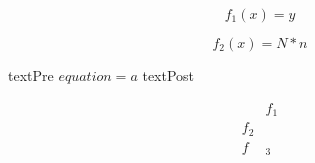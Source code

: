 \documentclass{article}
\begin{document}
    \begin{equation}
        f_1(x) = y
    \end{equation}
    
    \begin{equation*}
        f_2(x) = N*n
    \end{equation*}

    textPre $equation = a$ textPost

    \begin{align*}
        &f_1\\
        f_2&\\
        f&_3
    \end{align*}
\end{document}
